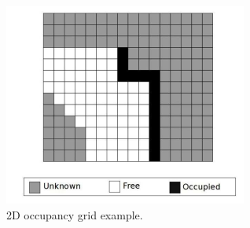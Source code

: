 \documentclass[11pt,openany]{book}
\begin{document}
\begin{figure}[H]
    \centering
    \includegraphics[width=\linewidth]{assets/2_7.png}
    \caption{2D occupancy grid example.}
    \label{fig:2.7}
\end{figure}
\end{document}
